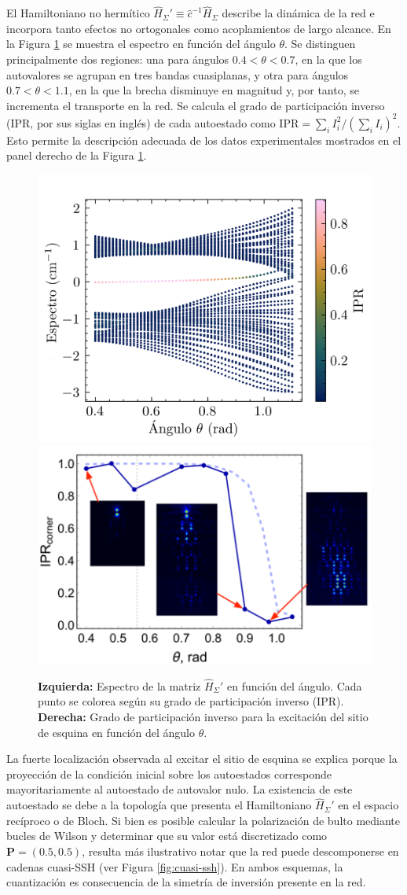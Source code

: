 El Hamiltoniano no hermítico $\hat{H}_\Sigma' \equiv \hat{c}^{-1} \hat{H}_\Sigma$ describe la dinámica de la red e incorpora tanto efectos no ortogonales como acoplamientos de largo alcance. En la Figura \ref{fig:honeycomb-spectra} se muestra el espectro en función del ángulo $\theta$. Se distinguen principalmente dos regiones: una para ángulos $0.4 < \theta < 0.7$, en la que los autovalores se agrupan en tres bandas cuasiplanas, y otra para ángulos $0.7 < \theta < 1.1$, en la que la brecha disminuye en magnitud y, por tanto, se incrementa el transporte en la red. Se calcula el grado de participación inverso (IPR, por sus siglas en inglés) de cada autoestado como $\text{IPR} = \sum_i I_i^2/(\sum_i I_i)^2$. Esto permite la descripción adecuada de los datos experimentales mostrados en el panel derecho de la Figura \ref{fig:honeycomb-spectra}.
\begin{figure}[H]
	\centering
	\includegraphics[width=0.45\linewidth]{codigo/honeycomb_eigenvalues_vs_angle.png}
	\includegraphics[width=0.5\linewidth]{media/ipr-corner-exp.png}
	\caption[Espectro de la red de panal de abeja de modos $p_y$ en función del ángulo]{\textbf{Izquierda:} Espectro de la matriz $\hat{H}_\Sigma'$ en función del ángulo. Cada punto se colorea según su grado de participación inverso (IPR). \textbf{Derecha:} Grado de participación inverso para la excitación del sitio de esquina en función del ángulo $\theta$.\label{fig:honeycomb-spectra}}
\end{figure} \vspace{-3ex}
La fuerte localización observada al excitar el sitio de esquina se explica porque la proyección de la condición inicial sobre los autoestados corresponde mayoritariamente al autoestado de autovalor nulo. La existencia de este autoestado se debe a la topología que presenta el Hamiltoniano $\hat{H}_\Sigma'$ en el espacio recíproco o de Bloch. Si bien es posible calcular la polarización de bulto mediante bucles de Wilson y determinar que su valor está discretizado como $\mathbf{P} = (0.5, 0.5)$, resulta más ilustrativo notar que la red puede descomponerse en cadenas cuasi-SSH (ver Figura \ref{fig:cuasi-ssh}). En ambos esquemas, la cuantización es consecuencia de la simetría de inversión presente en la red. 

